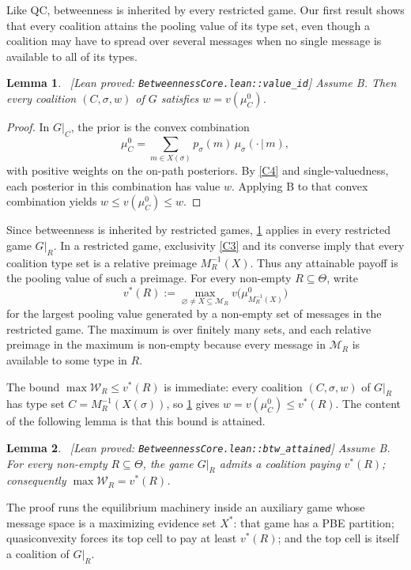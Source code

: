 \documentclass[11pt]{article}
\newtheorem{lemma}{Lemma}
\newcommand{\sep}{\,|\,}
\newcommand{\Msg}{\mathcal{M}}
\newcommand{\W}{\mathcal{W}}
\newcommand{\leanproved}[1]{{\footnotesize\textsf{\textcolor{green!55!black}{[Lean proved: \texttt{#1}]}}}}
\begin{document}
Like QC, betweenness is inherited by every restricted game. Our first result shows that every coalition attains the pooling value of its type set, even though a coalition may have to spread over several messages when no single message is available to all of its types.

\begin{lemma}\label{lem:value-id}\ \leanproved{BetweennessCore.lean::value\_id}
    Assume B. Then every coalition $(C,\sigma,w)$ of $G$ satisfies $w=v(\mu^0_C)$.
\end{lemma}

\begin{proof}
In $G\vert_C$, the prior is the convex combination
\[
    \mu^0_C=\sum_{m\in X(\sigma)}p_\sigma(m)\,\mu_\sigma(\cdot\sep m),
\]
with positive weights on the on-path posteriors. By \cref{C4} and single-valuedness, each posterior in this combination has value $w$. Applying B to that convex combination yields $w\leq v(\mu^0_C)\leq w$.
\end{proof}

Since betweenness is inherited by restricted games, \cref{lem:value-id} applies in every restricted game $G\vert_R$. In a restricted game, exclusivity \cref{C3} and its converse imply that every coalition type set is a relative preimage $M^{-1}_R(X)$. Thus any attainable payoff is the pooling value of such a preimage. For every non-empty $R\subseteq\Theta$, write
\[
    v^*(R):=\max_{\varnothing\neq X\subseteq\Msg_R} v\bigl(\mu^0_{M^{-1}_R(X)}\bigr)
\]
for the largest pooling value generated by a non-empty set of messages in the restricted game.
The maximum is over finitely many sets, and each relative preimage in the maximum is non-empty because every message in $\Msg_R$ is available to some type in $R$.

The bound $\max\W_R\leq v^*(R)$ is immediate: every coalition $(C,\sigma,w)$ of $G\vert_R$ has type set $C=M^{-1}_R(X(\sigma))$, so \cref{lem:value-id} gives $w=v(\mu^0_C)\leq v^*(R)$. The content of the following lemma is that this bound is attained.

\begin{lemma}\label{lem:btw-attained}\ \leanproved{BetweennessCore.lean::btw\_attained}
    Assume B. For every non-empty $R\subseteq\Theta$, the game $G\vert_R$ admits a coalition paying $v^*(R)$; consequently $\max\W_R=v^*(R)$.
\end{lemma}

The proof runs the equilibrium machinery inside an auxiliary game whose message space is a maximizing evidence set $X^*$: that game has a PBE partition; quasiconvexity forces its top cell to pay at least $v^*(R)$; and the top cell is itself a coalition of $G\vert_R$.
\end{document}
